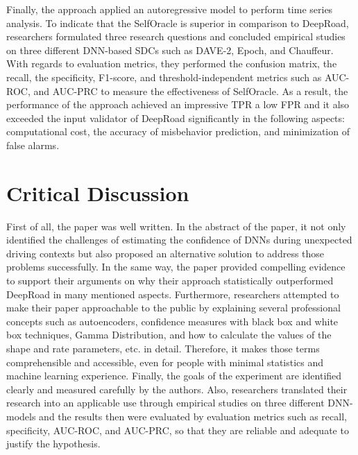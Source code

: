 \documentclass[10pt,a4paper]{report}
\begin{document}
%
Finally, the approach applied an autoregressive model to perform time series analysis.
%
To indicate that the SelfOracle is superior in comparison to DeepRoad, researchers formulated three research questions and concluded empirical studies on three different DNN-based SDCs such as DAVE-2, Epoch, and Chauffeur.
%
With regards to evaluation metrics, they performed the confusion matrix, the recall, the specificity, F1-score, and threshold-independent metrics such as AUC-ROC, and AUC-PRC to measure the effectiveness of SelfOracle.
%
As a result, the performance of the approach achieved an impressive TPR a low FPR and it also exceeded the input validator of DeepRoad significantly in the following aspects: computational cost, the accuracy of misbehavior prediction, and minimization of false alarms.


\section{Critical Discussion}
First of all, the paper was well written. In the abstract of the paper, it not only identified the challenges of estimating the confidence of DNNs during unexpected driving contexts but also proposed an alternative solution to address those problems successfully. 
%
In the same way, the paper provided compelling evidence to support their arguments on why their approach statistically outperformed DeepRoad in many mentioned aspects. 
%
Furthermore, researchers attempted to make their paper approachable to the public by explaining several professional concepts such as autoencoders, confidence measures with black box and white box techniques, Gamma Distribution, and how to calculate the values of the shape and rate parameters, etc. in detail. 
%
Therefore, it makes those terms comprehensible and accessible, even for people with minimal statistics and machine learning experience.
%
Finally, the goals of the experiment are identified clearly and measured carefully by the authors. 
%
Also, researchers translated their research into an applicable use through empirical studies on three different DNN-models and the results then were evaluated by evaluation metrics such as recall, specificity, AUC-ROC, and AUC-PRC, so that they are reliable and adequate to justify the hypothesis.
%
\end{document}
